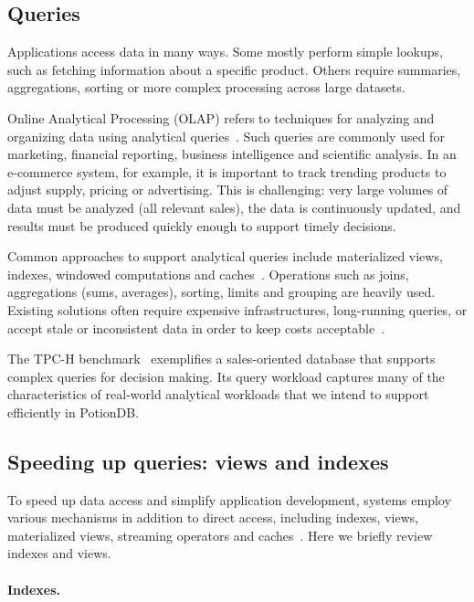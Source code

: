 \subsection{Queries}

Applications access data in many ways. Some mostly perform simple lookups, such
as fetching information about a specific product. Others require summaries,
aggregations, sorting or more complex processing across large datasets.

Online Analytical Processing (OLAP) refers to techniques for analyzing and
organizing data using analytical queries~\cite{olap,olap2}. Such queries are
commonly used for marketing, financial reporting, business intelligence and
scientific analysis. In an e-commerce system, for example, it is important to
track trending products to adjust supply, pricing or advertising. This is
challenging: very large volumes of data must be analyzed (all relevant sales),
the data is continuously updated, and results must be produced quickly enough to
support timely decisions.

Common approaches to support analytical queries include materialized views,
indexes, windowed computations and caches~\cite{olap,olap2,dbtoaster,analyticdb}.
Operations such as joins, aggregations (sums, averages), sorting, limits and
grouping are heavily used. Existing solutions often require expensive
infrastructures, long-running queries, or accept stale or inconsistent data in
order to keep costs acceptable~\cite{analyticdb,dbtoaster,sioulas2023real}.

The TPC-H benchmark~\cite{tpch,dbtoaster,analyticdb} exemplifies a sales-oriented
database that supports complex queries for decision making. Its query workload
captures many of the characteristics of real-world analytical workloads that we
intend to support efficiently in PotionDB.

\subsection{Speeding up queries: views and indexes}

To speed up data access and simplify application development, systems employ
various mechanisms in addition to direct access, including indexes, views,
materialized views, streaming operators and caches~\cite{silberschatz2005database,olap,dbtoaster,analyticdb}.
Here we briefly review indexes and views.

\paragraph{Indexes.}

